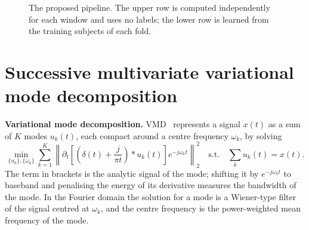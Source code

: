 \begin{figure}[H]\centering
{}
\caption{The proposed pipeline. The upper row is computed independently for each window and uses
no labels; the lower row is learned from the training subjects of each fold.}
\label{fig:pipeline}
\end{figure}

\section{Successive multivariate variational mode decomposition}
\textbf{Variational mode decomposition.} VMD~\cite{dragomiretskiy2014} represents a signal $x(t)$
as a sum of $K$ modes $u_k(t)$, each compact around a centre frequency $\omega_k$, by solving
\begin{equation}
\min_{\{u_k\},\{\omega_k\}} \sum_{k=1}^{K}
\left\| \partial_t\!\left[\left(\delta(t)+\frac{j}{\pi t}\right) * u_k(t)\right] e^{-j\omega_k t}
\right\|_2^2
\quad\text{s.t.}\quad \sum_{k} u_k(t) = x(t).
\end{equation}
The term in brackets is the analytic signal of the mode; shifting it by $e^{-j\omega_k t}$ to
baseband and penalising the energy of its derivative measures the bandwidth of the mode. In the
Fourier domain the solution for a mode is a Wiener-type filter of the signal centred at
$\omega_k$, and the centre frequency is the power-weighted mean frequency of the mode.

